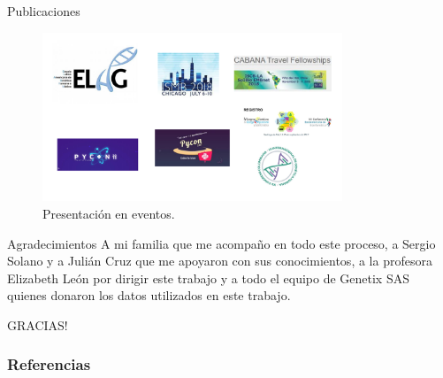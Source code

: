 \documentclass[xcolor=dvipsnames]{beamer}
\begin{document}
\begin{frame}{Publicaciones}
 \begin{figure}[H]
		\centering
		\includegraphics[width=0.8\textwidth]{congresostesis.pdf}
		\centering
		\caption{Presentación en eventos.} \label{fig:p}
	\end{figure}
\end{frame}

\begin{frame}{Agradecimientos}
 \justifying 
    A mi familia que me acompaño en todo este proceso, a Sergio Solano y a Julián Cruz que me apoyaron con sus conocimientos, a la profesora Elizabeth León por dirigir este trabajo y a todo el equipo de Genetix SAS quienes donaron los datos utilizados en este trabajo.
\end{frame}
\begin{frame}{}
  \centering \Large
	{\fontsize{40}{50}\selectfont GRACIAS!}
\end{frame}

\renewcommand{\addcontentsline}[3]{}%
\renewcommand{\section}[2]{}%

\begin{frame}[allowframebreaks]
	\frametitle{Referencias}
	
		
\end{frame}
\end{document}
